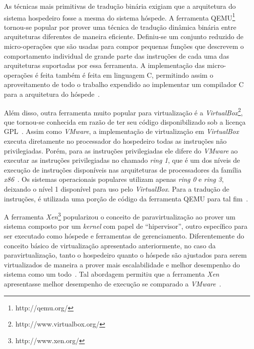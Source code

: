 As técnicas mais primitivas de tradução binária exigiam que a arquitetura
do sistema hospedeiro fosse a mesma do sistema hóspede. A ferramenta
QEMU\footnote{http://qemu.org/} tornou-se popular por prover uma técnica de
tradução dinâmica binária entre arquiteturas diferentes de maneira
eficiente. Definiu-se um conjunto reduzido de micro-operações que
são usadas para compor pequenas funções que descrevem o comportamento
individual de grande parte das instruções de cada uma das arquiteturas
suportadas por essa ferramenta. A implementação das micro-operações é feita
também é feita em linguagem C, permitindo assim o aproveitamento de todo o
trabalho expendido ao implementar um compilador C para a arquitetura do
hóspede~\cite{bellard2005qemu}.

Além disso, outra ferramenta muito popular para virtualização é a
\emph{VirtualBox}\footnote{http://www.virtualbox.org/}, que tornou-se conhecida
em razão de ter seu código disponibilizado sob a licença
GPL~\cite{watson2008virtualbox}. Assim como \emph{VMware}, a implementação de
virtualização em \emph{VirtualBox} executa diretamente no processador do
hospedeiro todas as instruções não privilegiadas. Porém, para as instruções
privilegiadas ele difere do \emph{VMware} ao executar as instruções
privilegiadas no chamado \emph{ring 1}, que é um dos níveis de execução de
instruções disponíveis nas arquiteturas de processadores da família
\emph{x86}~\cite{uhlig2005intel}. Os sistemas operacionais populares utilizam
apenas \emph{ring 0} e \emph{ring 3}, deixando o nível 1 disponível para uso
pelo \emph{VirtualBox}. Para a tradução de instruções, é utilizada uma porção
de código da ferramenta QEMU para tal fim~\cite{virtualboxTech}.

A ferramenta \emph{Xen}\footnote{http://www.xen.org/} popularizou o conceito de
paravirtualização ao prover um sistema composto por um \emph{kernel} com papel
de “hipervisor”, outro específico para ser executado como hóspede e ferramentas
de gerenciamento. Diferentemente do conceito básico de virtualização
apresentado anteriormente, no caso da paravirtualização, tanto o hospedeiro
quanto o hóspede são ajustados para serem virtualizados de maneira a prover
mais escalabilidade e melhor desempenho do sistema como um
todo~\cite{whitaker2002denali}. Tal abordagem permitiu que a ferramenta
\emph{Xen} apresentasse melhor desempenho de execução se comparado a
\emph{VMware}~\cite{barham2003xen}.


